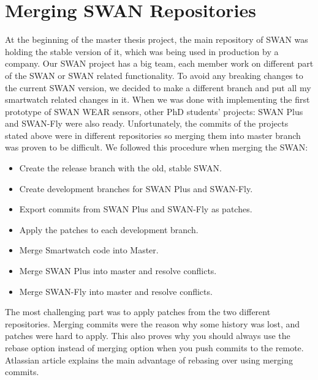 
\chapter{Merging SWAN Repositories} %

\label{AppendixB} %

At the beginning of the master thesis project, the main repository of SWAN was holding the stable version of it, which was being used in production 
by a  company. Our SWAN project has a big team, each member work on different part of the SWAN or SWAN related functionality.
To avoid any breaking changes to the current SWAN version, we decided to make a different branch and put all my smartwatch related changes in it.
When we was done with implementing the first prototype of SWAN WEAR sensors, other PhD students' projects: SWAN Plus\cite{swan_plus} and SWAN-Fly\cite{swan_fly} were also ready.
Unfortunately, the commits of the projects stated above were in different repositories so merging them into master branch was proven to be difficult.
We followed this procedure when merging the SWAN:
\begin{itemize}
 \item Create the release branch with the old, stable SWAN.
 \item Create development branches for SWAN Plus and SWAN-Fly.
 \item Export commits from SWAN Plus and SWAN-Fly as patches.
 \item Apply the patches to each development branch.
 \item Merge Smartwatch code into Master.
 \item Merge SWAN Plus into master and resolve conflicts.
 \item Merge SWAN-Fly into master and resolve conflicts.
\end{itemize}

The most challenging part was to apply patches from the two different repositories. Merging commits were the reason why some history was 
lost, and patches were hard to apply. This also proves why you should always use the rebase option instead of merging option when you push commits
to the remote. Atlassian article\cite{atlassian_merge_rebase} explains the main advantage of rebasing over using merging commits.